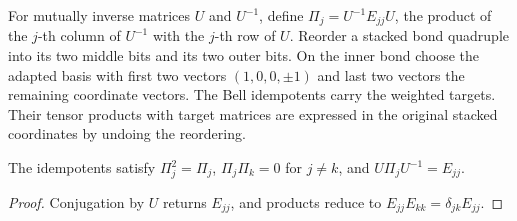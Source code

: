 \begin{definition}
    \label{def:asymex_basis_proj}
    \leanok
    For mutually inverse matrices $U$ and $U^{-1}$, define
    $\Pi_j=U^{-1}E_{jj}U$, the product of the $j$-th column of $U^{-1}$
    with the $j$-th row of $U$.
    Reorder a stacked bond quadruple into its two middle bits and its
    two outer bits. On the inner bond choose the adapted basis with
    first two vectors $(1,0,0,\pm1)$ and last two vectors the remaining
    coordinate vectors. The Bell idempotents carry the weighted targets.
    Their tensor products with target matrices are expressed in the
    original stacked coordinates by undoing the reordering.
\end{definition}

\begin{lemma}
    \label{thm:asymex_basis_proj}
    \leanok
    The idempotents satisfy $\Pi_j^2=\Pi_j$,
    $\Pi_j\Pi_k=0$ for $j\ne k$, and $U\Pi_jU^{-1}=E_{jj}$.
\end{lemma}
\begin{proof}
    \leanok
    Conjugation by $U$ returns $E_{jj}$, and products reduce to
    $E_{jj}E_{kk}=\delta_{jk}E_{jj}$.
\end{proof}

